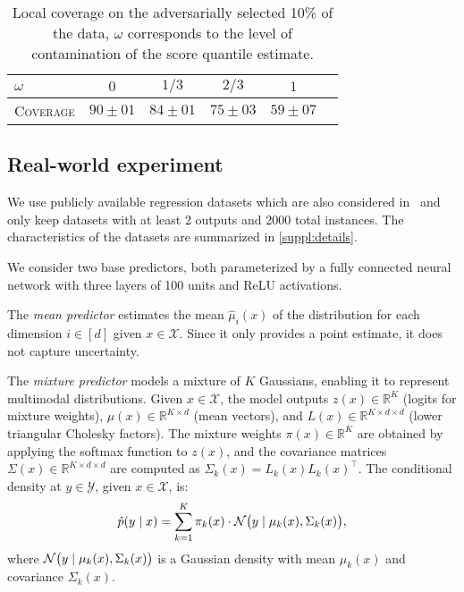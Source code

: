   \begin{table}[t]
    \centering
    \begin{tabular}{lccccc}
      \toprule
      $\omega$ & $0$ & $1/3$ & $2/3$ & $1$ \\
      \midrule
      \textsc{Coverage} & $90 \pm 01$ & $84 \pm 01$ & $75 \pm 03$ & $59 \pm 07$ \\
      \bottomrule
    \end{tabular}
    \caption{Local coverage on the adversarially selected 10\% of the data, $\omega$ corresponds to the level of contamination of the score quantile estimate.}
    \label{table:toy}
  \end{table}

\vspace{-15pt}
\subsection{Real-world experiment}

\vspace{-10pt}
  We use publicly available regression datasets which are also considered in~\citep{Tsoumakas2011-wf,Feldman2023-cc,wang2023probabilistic} and only keep datasets with at least 2 outputs and 2000 total instances. The characteristics of the datasets are summarized in \cref{suppl:details}.

  We consider two base predictors, both parameterized by a fully connected neural network with three layers of 100 units and ReLU activations.

  The \textit{mean predictor} estimates the mean $\hat{\mu}_i(x)$ of the distribution for each dimension $i \in [d]$ given $x \in \mathcal{X}$. Since it only provides a point estimate, it does not capture uncertainty.

  The \textit{mixture predictor} models a mixture of $K$ Gaussians, enabling it to represent multimodal distributions.
  Given \(x \in \mathcal{X}\), the model outputs \(z(x) \in \mathbb{R}^K\) (logits for mixture weights), \(\mu(x) \in \mathbb{R}^{K \times d}\) (mean vectors), and \(L(x) \in \mathbb{R}^{K \times d \times d}\) (lower triangular Cholesky factors). The mixture weights \(\pi(x) \in \mathbb{R}^K\) are obtained by applying the softmax function to \(z(x)\), and the covariance matrices \(\Sigma(x) \in \mathbb{R}^{K \times d \times d}\) are computed as \(\Sigma_k(x) = L_k(x) L_k(x)^\top\).
  The conditional density at \(y \in \mathcal{Y}\), given \(x \in \mathcal{X}\), is:
  \[
  \hat{p}(y \mid x) = \sum_{k=1}^K \pi_k(x) \cdot \mathcal{N}\bigl(y \mid \mu_k(x), \Sigma_k(x)\bigr),
  \]
  where \(\mathcal{N}\bigl(y \mid \mu_k(x), \Sigma_k(x)\bigr)\) is a Gaussian density with mean \(\mu_k(x)\) and covariance \(\Sigma_k(x)\).

